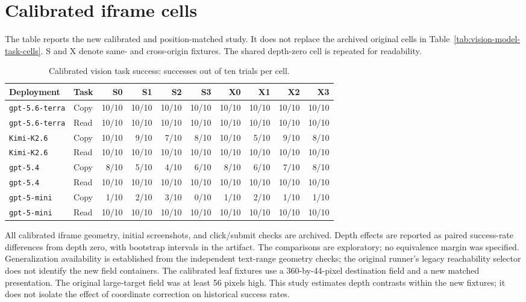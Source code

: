 \section{Calibrated iframe cells}
\label{app:calibrated}
The table reports the new calibrated and position-matched study. It does not replace the archived original cells in Table~\ref{tab:vision-model-task-cells}. S and X denote same- and cross-origin fixtures. The shared depth-zero cell is repeated for readability.

\begin{table}[h]
\centering
\small
\caption{Calibrated vision task success: successes out of ten trials per cell.}
\begin{tabular}{llrrrrrrrr}
\toprule
Deployment & Task & S0 & S1 & S2 & S3 & X0 & X1 & X2 & X3 \\
\midrule
\texttt{gpt-5.6-terra} & Copy & 10/10 & 10/10 & 10/10 & 10/10 & 10/10 & 10/10 & 10/10 & 10/10 \\
\texttt{gpt-5.6-terra} & Read & 10/10 & 10/10 & 10/10 & 10/10 & 10/10 & 10/10 & 10/10 & 10/10 \\
\texttt{Kimi-K2.6} & Copy & 10/10 & 9/10 & 7/10 & 8/10 & 10/10 & 5/10 & 9/10 & 8/10 \\
\texttt{Kimi-K2.6} & Read & 10/10 & 10/10 & 10/10 & 10/10 & 10/10 & 10/10 & 10/10 & 10/10 \\
\texttt{gpt-5.4} & Copy & 8/10 & 5/10 & 4/10 & 6/10 & 8/10 & 6/10 & 7/10 & 8/10 \\
\texttt{gpt-5.4} & Read & 10/10 & 10/10 & 10/10 & 10/10 & 10/10 & 10/10 & 10/10 & 10/10 \\
\texttt{gpt-5-mini} & Copy & 1/10 & 2/10 & 3/10 & 0/10 & 1/10 & 2/10 & 1/10 & 1/10 \\
\texttt{gpt-5-mini} & Read & 10/10 & 10/10 & 10/10 & 10/10 & 10/10 & 10/10 & 10/10 & 10/10 \\
\bottomrule
\end{tabular}
\end{table}
All calibrated iframe geometry, initial screenshots, and click/submit checks are archived. Depth effects are reported as paired success-rate differences from depth zero, with bootstrap intervals in the artifact. The comparisons are exploratory; no equivalence margin was specified. Generalization availability is established from the independent text-range geometry checks; the original runner's legacy reachability selector does not identify the new field containers.
The calibrated leaf fixtures use a 360-by-44-pixel destination field and a new matched presentation. The original large-target field was at least 56 pixels high. This study estimates depth contrasts within the new fixtures; it does not isolate the effect of coordinate correction on historical success rates.
\clearpage
